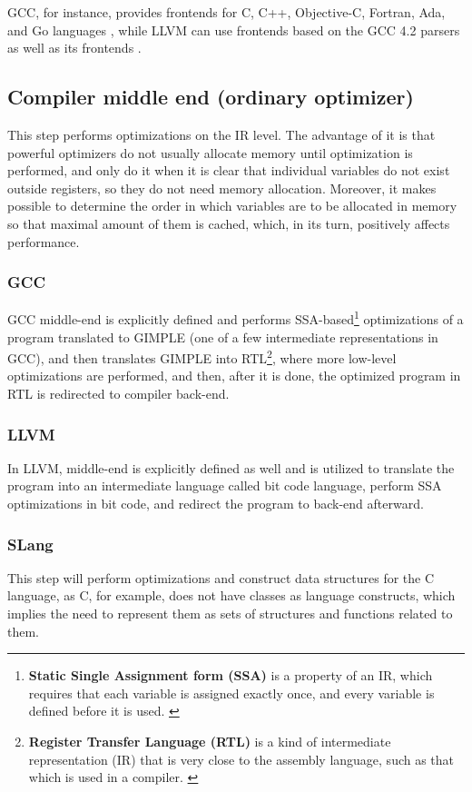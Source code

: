 GCC, for instance, provides frontends for C, C++, Objective-C, Fortran, Ada, and Go languages \cite{GNU}, while LLVM can use frontends based on the GCC 4.2 parsers as well as its frontends \cite{LLVM_features}.

\subsection{Compiler middle end (ordinary optimizer)}

This step performs optimizations on the IR level. The advantage of it is that powerful optimizers do not usually allocate memory until optimization is performed, and only do it when it is clear that individual variables do not exist outside registers, so they do not need memory allocation. Moreover, it makes possible to determine the order in which variables are to be allocated in memory so that maximal amount of them is cached, which, in its turn, positively affects performance.

\subsubsection{GCC}
GCC middle-end is explicitly defined and performs SSA-based\footnote{\textbf{Static Single Assignment form (SSA)} is a property of an IR, which requires that each variable is assigned exactly once, and every variable is defined before it is used. \cite{SSA_wiki} } optimizations of a program translated to GIMPLE (one of a few intermediate representations in GCC), and then translates GIMPLE into RTL\footnote{\textbf{Register Transfer Language (RTL)} is a kind of intermediate representation (IR) that is very close to the assembly language, such as that which is used in a compiler. \cite{RTL_wiki}}, where more low-level optimizations are performed, and then, after it is done, the optimized program in RTL is redirected to compiler back-end.

\subsubsection{LLVM}
In LLVM, middle-end is explicitly defined as well and is utilized to translate the program into an intermediate language called bit code language, perform SSA optimizations in bit code, and redirect the program to back-end afterward.

\subsubsection{SLang}
This step will perform optimizations and construct data structures for the C language, as C, for example, does not have classes as language constructs, which implies the need to represent them as sets of structures and functions related to them.

